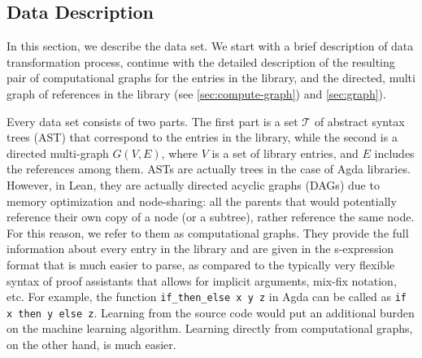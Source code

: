 \documentclass{article}
\begin{document}
\subsection{Data Description}

In this section, we describe the data set. We start with a brief description of data transformation process, continue with the detailed description of the resulting pair of computational graphs for the entries in the library, and the directed, multi graph of references in the library (see \ref{sec:compute-graph}) and \ref{sec:graph}).

Every data set consists of two parts. The first part is a set $\mathcal{T}$ of abstract syntax trees (AST) that correspond to the entries in the library, while the second is a directed multi-graph $G(V, E)$, where $V$ is a set of library entries, and $E$ includes the references among them. ASTs are actually trees in the case of Agda libraries. However, in Lean, they are actually directed acyclic graphs (DAGs) due to memory optimization and node-sharing: all the parents that would potentially reference their own copy of a node (or a subtree), rather reference the same node. For this reason, we refer to them as computational graphs. They provide the full information about every entry in the library and are given in the s-expression format that is much easier to parse, as compared to the typically very flexible syntax of proof assistants that allows for implicit arguments, mix-fix notation, etc. For example, the function \texttt{if\_then\_else x y z} in Agda can be called as \texttt{if x then y else z}. Learning from the source code would put an additional burden on the machine learning algorithm. Learning directly from computational graphs, on the other hand, is much easier.
\end{document}
